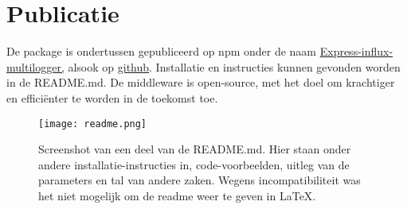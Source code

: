 \section{Publicatie}
\label{sec:publication}

De package is ondertussen gepubliceerd op npm onder de naam \href{https://www.npmjs.com/package/express-influx-multilogger}{Express-influx-multilogger,} alsook op \href{https://github.com/LeunensMichiel/express-influx-multilogger}{github}. Installatie en instructies kunnen gevonden worden in de README.md. De middleware is open-source, met het doel om krachtiger en efficiënter te worden in de toekomst toe.

\begin{figure}[h]
	\centering
	\texttt{[image: readme.png]}
	\caption{Screenshot van een deel van de README.md. Hier staan onder andere installatie-instructies in, code-voorbeelden, uitleg van de parameters en tal van andere zaken. Wegens incompatibiliteit was het niet mogelijk om de readme weer te geven in LaTeX.}
	\label{fig:readme}
\end{figure}